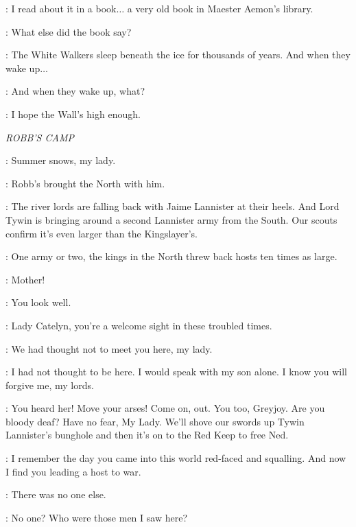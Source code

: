 \SAM: I read about it in a book$\ldots$ a very old book in Maester Aemon's library. 

\JON: What else did the book say? 

\SAM: The White Walkers sleep beneath the ice for thousands of years. And when they wake up$\ldots$  

\PYP: And when they wake up, what? 

\SAM: I hope the Wall's high enough. 


\scene

\textit{ROBB'S CAMP} 


\RODRIK: Summer snows, my lady. 

\CATELYN: Robb's brought the North with him. 

\ROBB: The river lords are falling back with Jaime Lannister at their heels. And Lord Tywin is bringing around a second Lannister army from the South. Our scouts confirm it's even larger than the Kingslayer's. 

\UMBER: One army or two, the kings in the North threw back hosts ten times as large. 


\ROBB: Mother!

\CATELYN: You look well. 

\UMBER: Lady Catelyn, you're a welcome sight in these troubled times. 

\GLOVER: We had thought not to meet you here, my lady. 

\CATELYN: I had not thought to be here. I would speak with my son alone. I know you will forgive me, my lords. 

\UMBER: You heard her! Move your arses! Come on, out.  You too, Greyjoy. Are you bloody deaf? Have no fear, My Lady. We'll shove our swords up Tywin Lannister's bunghole and then it's on to the Red Keep to free Ned. 


\CATELYN: I remember the day you came into this world red-faced and squalling. And now I find you leading a host to war. 

\ROBB: There was no one else. 

\CATELYN: No one? Who were those men I saw here? 

